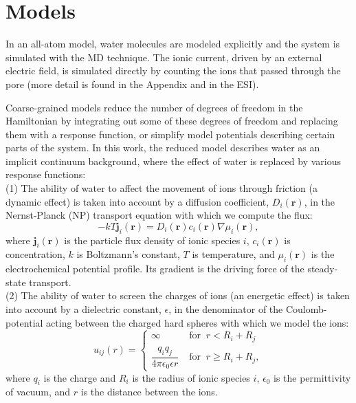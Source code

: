 \documentclass[fleqn,10pt]{SelfArx} %
\begin{document}
\section*{Models}
\label{sec:models}

In an all-atom model, water molecules are modeled explicitly and the system is simulated with the MD technique. 
The ionic current, driven by an external electric field, is simulated directly by counting the ions that passed through the pore (more detail is found in the Appendix and in the ESI).

Coarse-grained models reduce the number of degrees of freedom in the Hamiltonian by integrating out some of these degrees of freedom and replacing them with a response function, or simplify model potentials describing certain parts of the system.
In this work, the reduced model describes water as an implicit continuum background, where the effect of water is replaced by various response functions:\\
(1) The ability of water to affect the movement of ions through friction (a dynamic effect) is taken into account by a diffusion coefficient, $D_{i}(\mathbf{r})$, in the Nernst-Planck (NP) transport equation with which we compute the flux:
\begin{equation}
 -kT\mathbf{j}_{i}(\mathbf{r}) = D_{i}(\mathbf{r})c_{i}(\mathbf{r})\nabla \mu_{i}(\mathbf{r}),
 \label{eq:np}
\end{equation} 
where $\mathbf{j}_{i}(\mathbf{r})$ is the particle flux density of ionic species $i$, $c_{i}(\mathbf{r})$ is concentration, $k$ is Boltzmann's constant, $T$ is temperature, and $\mu_{i}(\mathbf{r})$ is the electrochemical potential profile. 
Its gradient is the driving force of the steady-state transport.\\
(2) The ability of water to screen the charges of ions (an energetic effect) is taken into account by a dielectric constant, $\epsilon$, in the denominator of the Coulomb-potential acting between the charged hard spheres with which we model the ions:
\begin{equation}
 u_{ij}(r)
=\left\{
        \begin{array}{ll}
    \infty & \; \mbox{for} \; \;  r<R_{i}+R_{j}\\
        \dfrac{q_{i}q_{j}}{4\pi \epsilon_{0}\epsilon r} & \; \mbox{for} \; \; r \geq R_{i}+R_{j}  ,
        \end{array}
        \right. 
\label{eq:pm}
\end{equation} 
where $q_{i}$ is the charge and $R_{i}$ is the radius of ionic species $i$, $\epsilon_{0}$ is the permittivity of vacuum, and $r$ is the distance between the ions.
\end{document}
